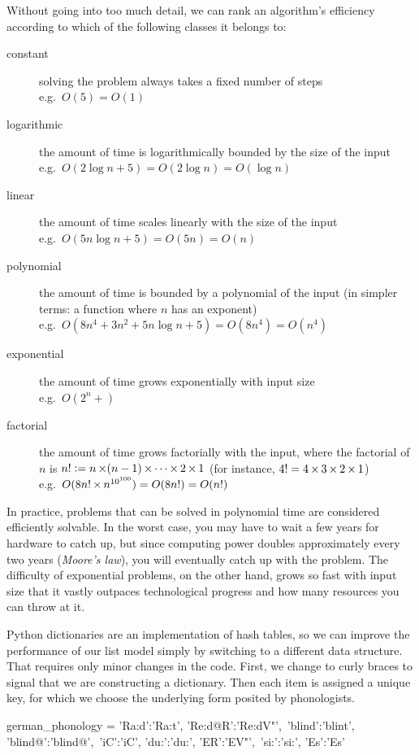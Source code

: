 \begin{techinfo}
    Without going into too much detail, we can rank an algorithm's efficiency according to which of the following classes it belongs to:
    \begin{description}
        \item[constant]
            solving the problem always takes a fixed number of steps\\
            e.g.\ $O(5) = O(1)$
        \item[logarithmic]
            the amount of time is logarithmically bounded by the size of the input\\
            e.g.\ $O(2 \log n + 5) = O(2 \log n) = O(\log n)$
        \item[linear]
            the amount of time scales linearly with the size of the input\\
            e.g.\ $O(5n \log n + 5) = O(5n) = O(n)$
        \item[polynomial]
            the amount of time is bounded by a polynomial of the input (in simpler terms: a function where $n$ has an exponent)\\
            e.g.\ $O(8n^4 + 3n^2 + 5n \log n + 5) = O(8n^4) = O(n^4)$
        \item[exponential]
            the amount of time grows exponentially with input size\\
            e.g.\ $O(2^n + )$
        \item[factorial]
            the amount of time grows factorially with the input, where the factorial of $n$ is $n! \mathrel{\mathop:}= n \mathop{\times} (n - 1) \mathop{\times} \cdots \mathop{\times} 2 \mathop{\times} 1$ (for instance, $4! = 4 \mathop{\times} 3 \mathop{\times} 2 \mathop{\times} 1$)\\
            e.g.\ $O(8n! \mathop{\times} n^{10^{100}}) = O(8n!) = O(n!)$
    \end{description}
    In practice, problems that can be solved in polynomial time are considered efficiently solvable.
    In the worst case, you may have to wait a few years for hardware to catch up, but since computing power doubles approximately every two years (\emph{Moore's law}), you will eventually catch up with the problem.
    The difficulty of exponential problems, on the other hand, grows so fast with input size that it vastly outpaces technological progress and how many resources you can throw at it.
\end{techinfo}

Python dictionaries are an implementation of hash tables, so we can improve the performance of our list model simply by switching to a different data structure.
That requires only minor changes in the code.
First, we change to curly braces to signal that we are constructing a dictionary.
Then each item is assigned a unique key, for which we choose the underlying form posited by phonologists.
%
\begin{center}
    \begin{pythoncode}
        german_phonology = {'Ra:d':'Ra:t', 'Re:d@R':'Re:dV"',\
            'blind':'blint', 'blind@':'blind@',\
            'iC':'iC', 'du:':'du:', 'ER':'EV"',\
            'si:':'si:', 'Es':'Es'}
    \end{pythoncode}
\end{center}

